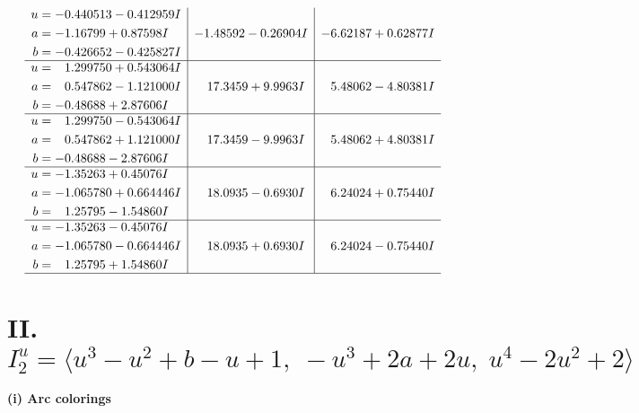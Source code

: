 \documentclass[1p]{elsarticle_modified}
\theoremstyle{definition}
\begin{document}
$$\begin{array}{c|c|c}
\begin{aligned}
u &= -0.440513 - 0.412959 I \\
a &= -1.16799 + 0.87598 I \\
b &= -0.426652 - 0.425827 I\end{aligned}
 & -1.48592 - 0.26904 I & -6.62187 + 0.62877 I \\ \hline\begin{aligned}
u &= \phantom{-}1.299750 + 0.543064 I \\
a &= \phantom{-}0.547862 - 1.121000 I \\
b &= -0.48688 + 2.87606 I\end{aligned}
 & \phantom{-}17.3459 + 9.9963 I & \phantom{-}5.48062 - 4.80381 I \\ \hline\begin{aligned}
u &= \phantom{-}1.299750 - 0.543064 I \\
a &= \phantom{-}0.547862 + 1.121000 I \\
b &= -0.48688 - 2.87606 I\end{aligned}
 & \phantom{-}17.3459 - 9.9963 I & \phantom{-}5.48062 + 4.80381 I \\ \hline\begin{aligned}
u &= -1.35263 + 0.45076 I \\
a &= -1.065780 + 0.664446 I \\
b &= \phantom{-}1.25795 - 1.54860 I\end{aligned}
 & \phantom{-}18.0935 - 0.6930 I & \phantom{-}6.24024 + 0.75440 I \\ \hline\begin{aligned}
u &= -1.35263 - 0.45076 I \\
a &= -1.065780 - 0.664446 I \\
b &= \phantom{-}1.25795 + 1.54860 I\end{aligned}
 & \phantom{-}18.0935 + 0.6930 I & \phantom{-}6.24024 - 0.75440 I\\
 \hline 
 \end{array}$$\newpage\newpage\renewcommand{\arraystretch}{1}
\centering \section*{II. $I^u_{2}= \langle u^3- u^2+b- u+1,\;- u^3+2 a+2 u,\;u^4-2 u^2+2 \rangle$}
\flushleft \textbf{(i) Arc colorings}\\
\end{document}
